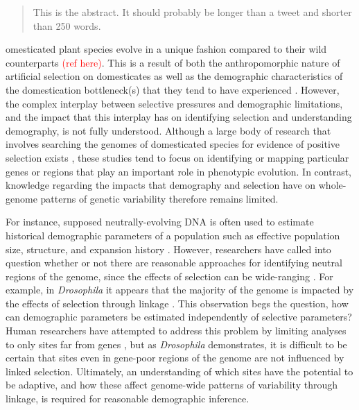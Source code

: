 \documentclass{pnastwo}
\begin{document}
\begin{article}

\begin{abstract}
This is the abstract. It should probably be longer than a tweet and shorter than 250 words.
\end{abstract}

omesticated plant species evolve in a unique fashion
compared to their wild counterparts \textcolor{red}{(ref here)}. This
is a result of both the anthropomorphic nature of artificial selection on
domesticates \cite{purugganan2009} as well as the demographic characteristics of the domestication
bottleneck(s) that they tend to have experienced
\cite{ross2007}. However, the
complex interplay between selective pressures and demographic
limitations, and the impact that this interplay has on identifying
selection and understanding demography, is not fully understood. Although a large body of
research that involves searching the genomes of domesticated species for evidence
of positive selection exists \cite{hufford2012, he2011, OTHERS?}, these studies tend to focus on
identifying or mapping particular genes or regions that play an
important role in phenotypic evolution. In contrast, knowledge regarding the impacts that demography and
selection have on whole-genome patterns of genetic variability therefore remains limited.

For instance, supposed neutrally-evolving DNA is often used to estimate historical demographic
parameters of a population such as effective population size, structure, and expansion
history \cite{luikart2003, gutenkunst2009}. However, researchers have
called into question whether or not there are reasonable approaches
for identifying neutral regions of the genome, since the effects of
selection can be wide-ranging \cite{li2012, slotte2014}. For example, in
\emph{Drosophila} it appears that the majority of the genome is
impacted by the effects of selection through linkage
\cite{sella2009}. This observation begs the question, how can
demographic parameters be estimated independently of
selective parameters? Human researchers have attempted to address this
problem by limiting analyses to only sites far from genes
\cite{gazave2014}, but as \emph{Drosophila} demonstrates, it is
difficult to be certain that sites even in gene-poor regions of the
genome are not influenced by linked selection. Ultimately, an understanding
of which sites have the potential to be adaptive, and how these affect
genome-wide patterns of variability through linkage, is required for
reasonable demographic inference.


\end{article}
\end{document}
